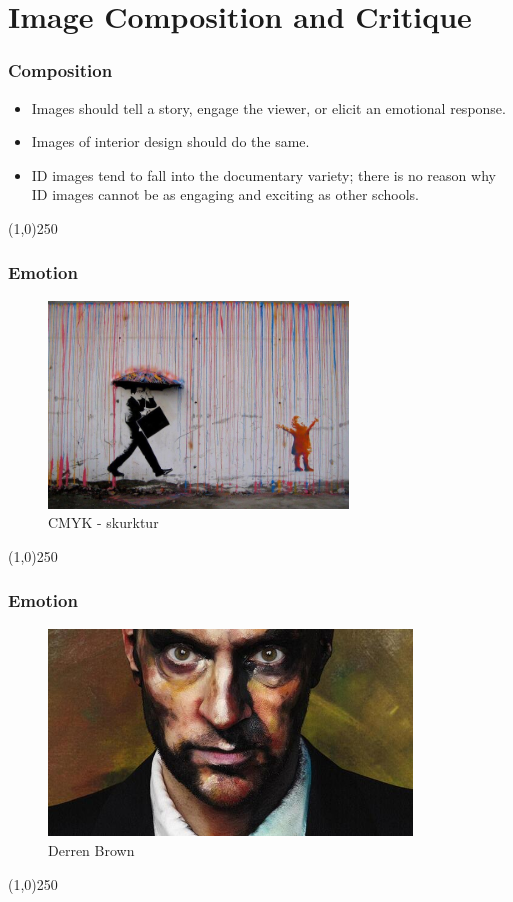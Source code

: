 \section{Image Composition and Critique}



\begin{frame}
\frametitle{Composition}
\begin{itemize}
	\item Images should tell a story, engage the viewer, or elicit an emotional response.
	\item Images of interior design should do the same.
	\item ID images tend to fall into the documentary variety; there is no reason why ID images cannot be as engaging and exciting as other schools.
\end{itemize}
\end{frame}
\begin{center}\line(1,0){250}\end{center}


\begin{frame}
\frametitle{Emotion}
\begin{figure}
	\centering
		\includegraphics[height=5.5cm]{img/candc/2091078908.jpg}
	\caption{CMYK - skurktur}
	\label{fig:CMYK}
\end{figure}
\end{frame}
\begin{center}\line(1,0){250}\end{center}


\begin{frame}
\frametitle{Emotion}
\begin{figure}
	\centering
		\includegraphics[height=5.5cm]{img/candc/DERREN-BROWN.jpg}
	\caption{Derren Brown}
	\label{fig:DerrenBrown}
\end{figure}
\end{frame}
\begin{center}\line(1,0){250}\end{center}



